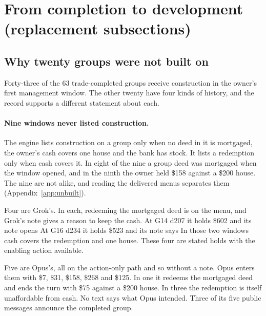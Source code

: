 \section{From completion to development (replacement subsections)}
\label{sec:development}

\subsection{Why twenty groups were not built on}
\label{sec:unbuilt}

Forty-three of the 63 trade-completed groups receive construction in the owner's first management window. The other twenty have four kinds of history, and the record supports a different statement about each.

\paragraph{Nine windows never listed construction.} The engine lists construction on a group only when no deed in it is mortgaged, the owner's cash covers one house and the bank has stock. It lists a redemption only when cash covers it. In eight of the nine a group deed was mortgaged when the window opened, and in the ninth the owner held \$158 against a \$200 house. The nine are not alike, and reading the delivered menus separates them (Appendix~\ref{app:unbuilt}).

Four are Grok's. In each, redeeming the mortgaged deed is on the menu, and Grok's note gives a reason to keep the cash. At G14 d207 it holds \$602 and its note opens  At G16 d234 it holds \$523 and its note says  In those two windows cash covers the redemption and one house. These four are stated holds with the enabling action available.

Five are Opus's, all on the action-only path and so without a note. Opus enters them with \$7, \$31, \$158, \$268 and \$125. In one it redeems the mortgaged deed and ends the turn with \$75 against a \$200 house. In three the redemption is itself unaffordable from cash. No text says what Opus intended. Three of its five public messages announce the completed group.

